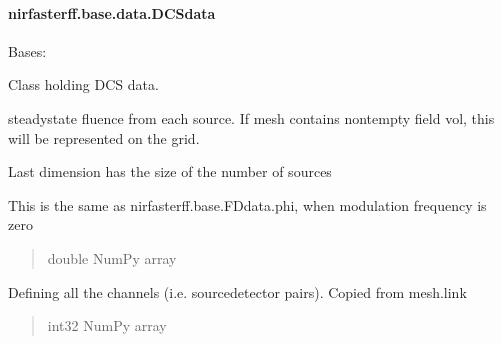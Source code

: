 \documentclass[letterpaper,10pt,english]{sphinxmanual}
\begin{document}
\sphinxstepscope


\paragraph{nirfasterff.base.data.DCSdata}
\label{\detokenize{_autosummary/nirfasterff.base.data.DCSdata:nirfasterff-base-data-dcsdata}}\label{\detokenize{_autosummary/nirfasterff.base.data.DCSdata::doc}}

\begin{fulllineitems}
\label{\detokenize{_autosummary/nirfasterff.base.data.DCSdata:nirfasterff.base.data.DCSdata}}
\pysigstartsignatures
{}
\pysigstopsignatures
\sphinxAtStartPar
Bases: 

\sphinxAtStartPar
Class holding DCS data.

\begin{fulllineitems}
\label{\detokenize{_autosummary/nirfasterff.base.data.DCSdata:nirfasterff.base.data.DCSdata.phi}}
\pysigstartsignatures
{}
\pysigstopsignatures
\sphinxAtStartPar
steady\sphinxhyphen{}state fluence from each source. If mesh contains non\sphinxhyphen{}tempty field vol, this will be represented on the grid.

\sphinxAtStartPar
Last dimension has the size of the number of sources

\sphinxAtStartPar
This is the same as nirfasterff.base.FDdata.phi, when modulation frequency is zero
\begin{quote}\begin{description}
\sphinxAtStartPar
double NumPy array

\end{description}\end{quote}

\end{fulllineitems}


\begin{fulllineitems}
\label{\detokenize{_autosummary/nirfasterff.base.data.DCSdata:nirfasterff.base.data.DCSdata.link}}
\pysigstartsignatures
{}
\pysigstopsignatures
\sphinxAtStartPar
Defining all the channels (i.e. source\sphinxhyphen{}detector pairs). Copied from mesh.link
\begin{quote}\begin{description}
\sphinxAtStartPar
int32 NumPy array


\end{description}
\end{quote}
\end{fulllineitems}
\end{fulllineitems}
\end{document}
